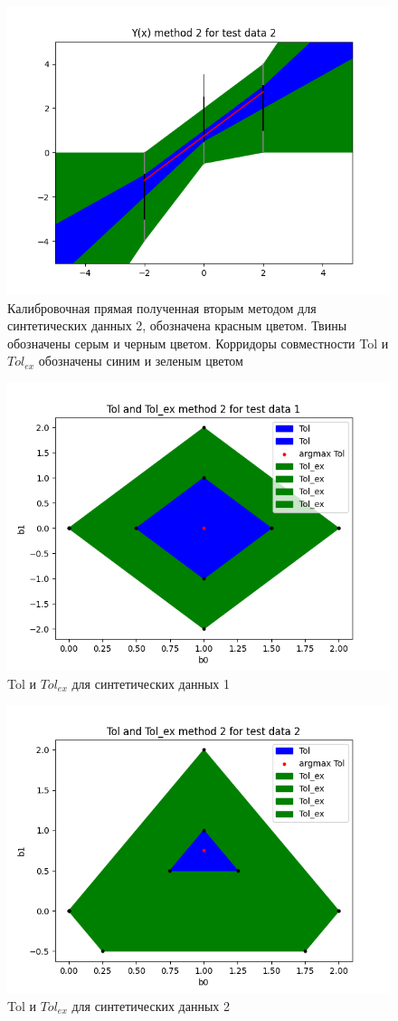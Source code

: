 \begin{figure}[H]
    \centering
    \includegraphics[width=0.7\linewidth]{image/test_2_method_2_corridor_joint_dependence.png}
    \caption{Калибровочная прямая полученная вторым методом для синтетических данных 2, обозначена красным цветом. Твины обозначены серым и черным цветом. Корридоры совместности Tol и $Tol_{ex}$ обозначены синим и зеленым цветом}
    \label{fig:test_2_method_2_corridor_joint_dependence}
\end{figure}

\begin{figure}[H]
    \centering
    \includegraphics[width=0.7\linewidth]{image/test_1_method_2.png}
    \caption{Tol и $Tol_{ex}$ для синтетических данных 1}
    \label{fig:test_1_method_2}
\end{figure}

\begin{figure}[H]
    \centering
    \includegraphics[width=0.7\linewidth]{image/test_2_method_2.png}
    \caption{Tol и $Tol_{ex}$ для синтетических данных 2}
    \label{fig:test_2_method_2}
\end{figure}
